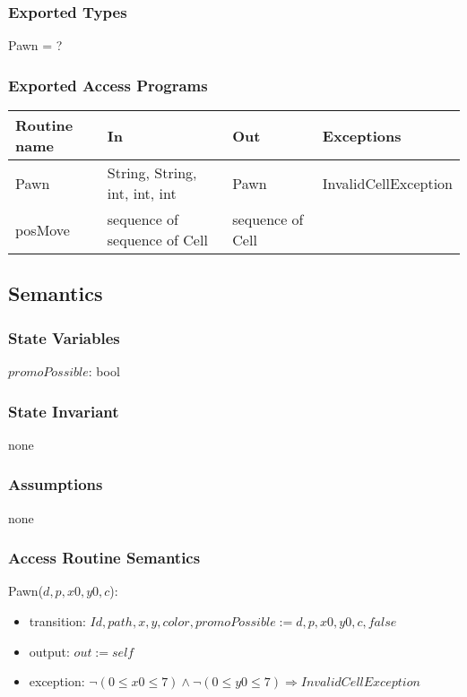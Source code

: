 \documentclass[12pt]{article}
\begin{document}
\subsubsection* {Exported Types}

Pawn = ?

\subsubsection* {Exported Access Programs}

\begin{tabular}{| l | l | l | l |}
\hline
\textbf{Routine name} & \textbf{In} & \textbf{Out} & \textbf{Exceptions}\\
\hline
Pawn &String, String, int, int, int & Pawn & InvalidCellException\\
\hline
posMove & sequence of sequence of Cell & sequence of Cell & ~\\
\hline
\end{tabular}

\subsection* {Semantics}

\subsubsection* {State Variables}

$promoPossible$: bool

\subsubsection* {State Invariant}

none

\subsubsection* {Assumptions}

none

\subsubsection* {Access Routine Semantics}

Pawn($d, p, x0, y0, c$):
\begin{itemize}
\item transition: $Id, path, x, y, color, promoPossible := d, p, x0, y0, c, false$
\item output: $out := \mathit{self}$
\item exception: $ \neg (0 \leq x0 \leq 7) \wedge  \neg (0 \leq y0 \leq 7) \Rightarrow InvalidCellException$
\end{itemize}
\end{document}
